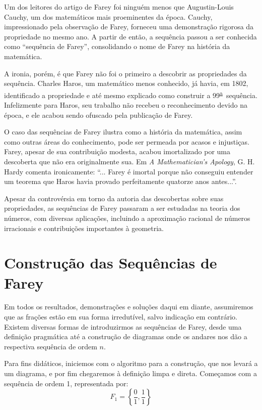 \documentclass{hipatia}
\theoremstyle{definition} %
\newcommand{\superau}{\textsuperscript{\underline{a}}~}
\begin{document}
Um dos leitores do artigo de Farey foi ninguém menos que Augustin-Louis Cauchy, um dos matemáticos mais proeminentes da época. Cauchy, impressionado pela observação de Farey, forneceu uma demonstração rigorosa da propriedade no mesmo ano. A partir de então, a sequência passou a ser conhecida como ``sequência de Farey'', consolidando o nome de Farey na história da matemática.

A ironia, porém, é que Farey não foi o primeiro a descobrir as propriedades da sequência. Charles Haros, um matemático menos conhecido, já havia, em 1802, identificado a propriedade e até mesmo explicado como construir a 99\superau sequência. Infelizmente para Haros, seu trabalho não recebeu o reconhecimento devido na época, e ele acabou sendo ofuscado pela publicação de Farey.

O caso das sequências de Farey ilustra como a história da matemática, assim como outras áreas do conhecimento, pode ser permeada por acasos e injustiças. Farey, apesar de sua contribuição modesta, acabou imortalizado por uma descoberta que não era originalmente sua. Em \textit{A Mathematician's Apology}, G. H. Hardy comenta ironicamente: ``... Farey é imortal porque não conseguiu entender um teorema que Haros havia provado perfeitamente quatorze anos antes...''.

Apesar da controvérsia em torno da autoria das descobertas sobre suas propriedades, as sequências de Farey passaram a ser estudadas na teoria dos números, com diversas aplicações, incluindo a aproximação racional de números irracionais e contribuições importantes à geometria. 



\section{Construção das Sequências de Farey}

Em todos os resultados, demonstrações e soluções daqui em diante, assumiremos que as frações estão em sua forma irredutível, salvo indicação em contrário. Existem diversas formas de introduzirmos as sequências de Farey, desde uma definição pragmática até a construção de diagramas onde os andares nos dão a respectiva sequência de ordem $n$.

Para fins didáticos, iniciemos com o algoritmo para a construção, que nos levará a um diagrama, e por fim chegaremos à definição limpa e direta. Começamos com a sequência de ordem 1, representada por:
\[
F_1 = \left\{ \frac{0}{1}, \frac{1}{1} \right\}
\]
\end{document}
